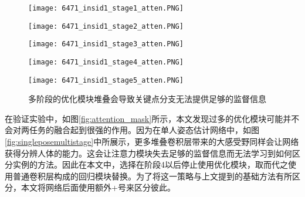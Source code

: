 \begin{figure}[ht]
	\centering
	\begin{minipage}[t]{0.18\linewidth}
		\texttt{[image: 6471\_insid1\_stage1\_atten.PNG]}
	\end{minipage}
	\begin{minipage}[t]{0.18\linewidth}
		\texttt{[image: 6471\_insid1\_stage2\_atten.PNG]}
	\end{minipage}
	\begin{minipage}[t]{0.18\linewidth}
		\texttt{[image: 6471\_insid1\_stage3\_atten.PNG]}
	\end{minipage}
	\begin{minipage}[t]{0.18\linewidth}
		\texttt{[image: 6471\_insid1\_stage4\_atten.PNG]}
	\end{minipage}
	\begin{minipage}[t]{0.18\linewidth}
		\texttt{[image: 6471\_insid1\_stage5\_atten.PNG]}
	\end{minipage}
	\caption{多阶段的优化模块堆叠会导致关键点分支无法提供足够的监督信息}
	\label{fig:multistageattention}
\end{figure}

在验证实验中，如图\ref{fig:attention_mask}所示，本文发现过多的优化模块可能并不会对两任务的融合起到很强的作用。因为在单人姿态估计网络中，如图\ref{fig:singleposemultistage}中所展示，更多堆叠卷积层带来的大感受野同样会让网络获得分辨人体的能力。这会让注意力模块失去足够的监督信息而无法学习到如何区分实例的方法。因此在本文中，选择在阶段4以后停止使用优化模块，取而代之使用普通卷积层构成的回归模块替换。为了将这一策略与上文提到的基础方法有所区分，本文将网络后面使用额外+号来区分彼此。

